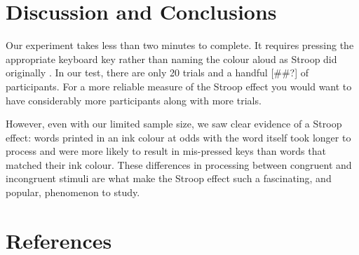 \documentclass{article}
\begin{document}
\pagebreak

\section{Discussion and Conclusions}
\label{sec:orgd7e6639}

Our experiment takes less than two minutes to complete. It requires pressing the appropriate keyboard key rather than naming the colour aloud as Stroop did originally \cite{Stroop1935}. In our test, there are only 20 trials and a handful [\#\#?] of participants. For a more reliable measure of the Stroop effect you would want to have considerably more participants along with more trials.

However, even with our limited sample size, we saw clear evidence of a Stroop effect: words printed in an ink colour at odds with the word itself took longer to process and were more likely to result in mis-pressed keys than words that matched their ink colour. These differences in processing between congruent and incongruent stimuli are what make the Stroop effect such a fascinating, and popular, phenomenon to study.

\section{References}
\label{sec:org12ce34f}


\end{document}
